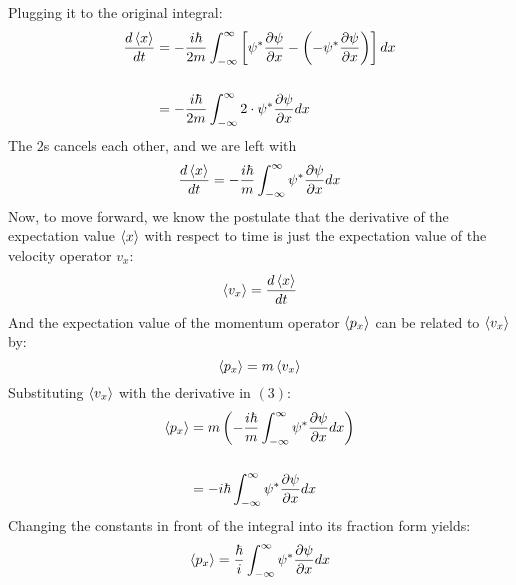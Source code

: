 \documentclass[hidelinks, a4paper, 12pt]{article}
\begin{document}
            Plugging it to the original integral:
            \[\begin{split}
                \frac{d\braket{x}}{dt} &= -\frac{i\hbar}{2m} \int_{-\infty}^{\infty} \left[ \psi^* \frac{\partial \psi}{\partial x} - \left(- \psi^* \frac{\partial \psi}{\partial x}\right) \right]dx\\
                \\
                &= -\frac{i\hbar}{2m} \int_{-\infty}^{\infty} 2 \cdot \psi^* \frac{\partial \psi}{\partial x} dx\\
            \end{split}\]
            The $2$s cancels each other, and we are left with
            \begin{equation}
                \frac{d\braket{x}}{dt} = -\frac{i\hbar}{m} \int_{-\infty}^{\infty} \psi^* \frac{\partial \psi}{\partial x} dx
            \end{equation}
            Now, to move forward, we know the postulate that the derivative of the expectation value $\braket{x}$ with respect to time is just the expectation value of the velocity operator $v_x$:
            \[\braket{v_x} = \frac{d\braket{x}}{dt}\]
            And the expectation value of the momentum operator $\braket{p_x}$ can be related to $\braket{v_x}$ by:
            \[\braket{p_x} = m \braket{v_x}\]
            Substituting $\braket{v_x}$ with the derivative in $(3)$:
            \[\begin{split}
                \braket{p_x} &= m \left(-\frac{i\hbar}{m} \int_{-\infty}^{\infty} \psi^* \frac{\partial \psi}{\partial x} dx \right)\\
                \\
                &= -i\hbar \int_{-\infty}^{\infty} \psi^* \frac{\partial \psi}{\partial x} dx\\
            \end{split}\]
            Changing the constants in front of the integral into its fraction form yields:
            \begin{equation}
                \braket{p_x} = \frac{\hbar}{i} \int_{-\infty}^{\infty} \psi^* \frac{\partial \psi}{\partial x} dx
            \end{equation}
\end{document}
